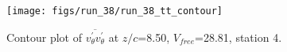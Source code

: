 \begin{figure}[H]
\centering
\texttt{[image: figs/run\_38/run\_38\_tt\_contour]}
\caption{Contour plot of $\overline{v_{\theta}^{\prime} v_{\theta}^{\prime}}$ at $z/c$=8.50, $V_{free}$=28.81, station 4.}
\label{fig:run_38_tt_contour}
\end{figure}


